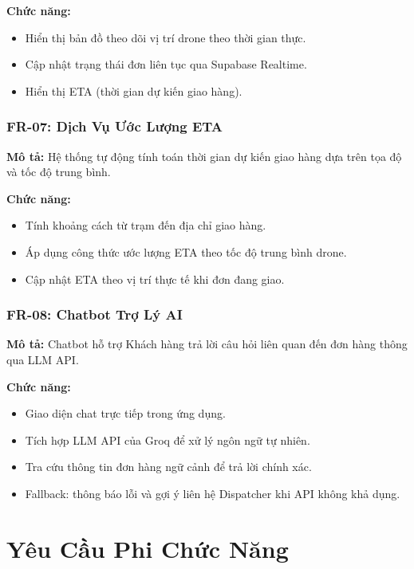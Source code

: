 \textbf{Chức năng:}
\begin{itemize}
  \item Hiển thị bản đồ theo dõi vị trí drone theo thời gian thực.
  \item Cập nhật trạng thái đơn liên tục qua Supabase Realtime.
  \item Hiển thị ETA (thời gian dự kiến giao hàng).
\end{itemize}

\subsubsection{FR-07: Dịch Vụ Ước Lượng ETA}
\textbf{Mô tả:} Hệ thống tự động tính toán thời gian dự kiến giao hàng dựa trên tọa độ và tốc độ trung bình.

\textbf{Chức năng:}
\begin{itemize}
  \item Tính khoảng cách từ trạm đến địa chỉ giao hàng.
  \item Áp dụng công thức ước lượng ETA theo tốc độ trung bình drone.
  \item Cập nhật ETA theo vị trí thực tế khi đơn đang giao.
\end{itemize}

\subsubsection{FR-08: Chatbot Trợ Lý AI}
\textbf{Mô tả:} Chatbot hỗ trợ Khách hàng trả lời câu hỏi liên quan đến đơn hàng thông qua LLM API.

\textbf{Chức năng:}
\begin{itemize}
  \item Giao diện chat trực tiếp trong ứng dụng.
  \item Tích hợp LLM API của Groq để xử lý ngôn ngữ tự nhiên.
  \item Tra cứu thông tin đơn hàng ngữ cảnh để trả lời chính xác.
  \item Fallback: thông báo lỗi và gợi ý liên hệ Dispatcher khi API không khả dụng.
\end{itemize}

\section{Yêu Cầu Phi Chức Năng}

